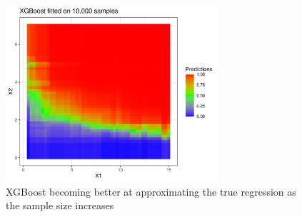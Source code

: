 \documentclass[./main.tex]{subfiles}
\begin{document}
\begin{figure}[H]
    \centering
    \includegraphics[width=0.7\textwidth]{figures/xgboost10k.png}
    \caption{XGBoost becoming better at approximating the true regression as the sample size increases}
    \label{fig:xgboost10k}
\end{figure}
\end{document}
